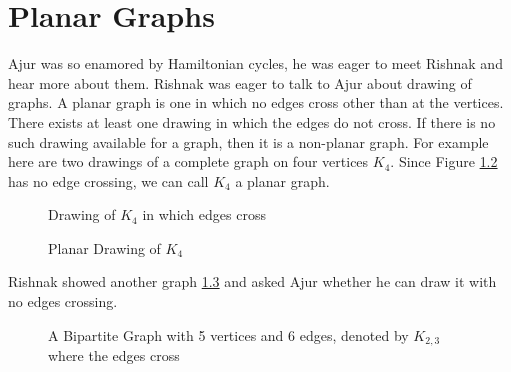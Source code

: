\chapter{Planar Graphs}
Ajur was so enamored by Hamiltonian cycles, he was eager to meet Rishnak and hear more about them. Rishnak was eager to talk to Ajur about drawing of graphs.
A planar graph is one in which no edges cross other than at
the vertices. There exists at least one drawing in which the edges do not cross.
If there is no such drawing available for a graph, then it is a non-planar graph.
For example here are two drawings of a complete graph on four vertices $K_4$. Since Figure \ref{9g2} has no edge crossing, we can call $K_4$ a planar graph.
\begin{figure}
\begin{center}
\caption{ Drawing of $K_4$ in which edges cross}\label{9g1}
\end{center}
\end{figure}
\begin{figure}
\begin{center}
\caption{ Planar Drawing of $K_4$}\label{9g2}
\end{center}
\end{figure}
 Rishnak showed another graph \ref{9g3} and asked Ajur whether he can draw it with no edges crossing.
 \begin{figure}
\begin{center}
\caption{ A Bipartite Graph with 5 vertices and 6 edges, denoted by $K_{2,3}$ where the edges cross}\label{9g3}
\end{center}
\end{figure}
